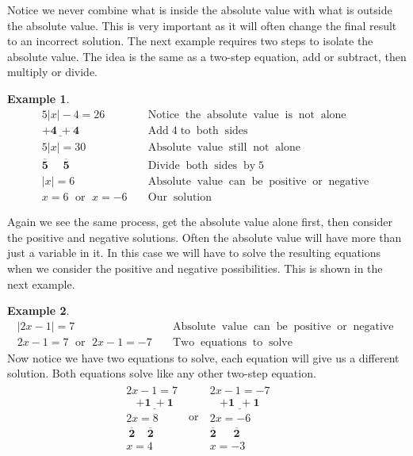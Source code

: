 \documentclass[12pt]{book}
\theoremstyle{definition}
\newtheorem{example}{Example}
\newcommand{\tmmathbf}[1]{\ensuremath{\boldsymbol{#1}}}
\newcommand{\tmop}[1]{\ensuremath{\operatorname{#1}}}
\begin{document}
Notice we never combine what is inside the absolute value with what is outside the absolute value. This is very important as it will often change the final result to an incorrect solution. The next example requires two steps to isolate the absolute value. The idea is the same as a two-step equation, add or subtract, then multiply or divide.
\begin{example}\label{Lin37}
  \begin{eqnarray*}
    5 |x| - 4 = 26 &  & \tmop{Notice} \tmop{the} \tmop{absolute} \tmop{value}
    \tmop{is} \tmop{not} \tmop{alone}\\
    \underline{\tmmathbf{+ 4 ~+ 4}} &  & \tmop{Add} 4 \tmop{to} \tmop{both}
    \tmop{sides}\\
    5 |x| = 30 &  & \tmop{Absolute} \tmop{value} \tmop{still} \tmop{not}
    \tmop{alone}\\
    \tmmathbf{\overline{5} ~~~~~~ \overline{5}}~ &  & \tmop{Divide} \tmop{both}
    \tmop{sides} \tmop{by} 5\\
    |x| = 6 &  & \tmop{Absolute} \tmop{value} \tmop{can} \tmop{be}
    \tmop{positive} \tmop{or} \tmop{negative}\\
    x = 6 \tmop{~or~} x = - 6 &  & \tmop{Our} \tmop{solution}
  \end{eqnarray*}
\end{example}
Again we see the same process, get the absolute value alone first, then consider the positive and negative solutions. Often the absolute value will have more than just a variable in it. In this case we will have to solve the resulting equations when we consider the positive and negative possibilities. This is shown in the next example.
\begin{example}\label{Lin38}
  \begin{eqnarray*}
    |2x - 1| = 7 &  & \tmop{Absolute} \tmop{value} \tmop{can} \tmop{be}
    \tmop{positive} \tmop{or} \tmop{negative}\\
    2 x - 1 = 7 \tmop{~or~} 2 x - 1 = - 7 &  & \tmop{Two} \tmop{equations}
    \tmop{to} \tmop{solve}
  \end{eqnarray*}
   Now notice we have two equations to solve, each equation will give us a
  different solution. Both equations solve like any other two-step equation.
  \begin{eqnarray*}
    \begin{array}{l}
      2 x - 1 = 7\\
      ~~~~\tmmathbf{\underline{+ 1 ~+ 1}}\\
      2 x = 8\\
      ~\tmmathbf{\overline{2} ~~~~~ \overline{2}}\\
      x = 4
    \end{array} \tmop{~or~} \begin{array}{l}
      2 x - 1 = - 7\\
      ~~~~\underline{\tmmathbf{+ 1 ~~+ 1}}\\
      2 x = - 6\\
      \tmmathbf{\overline{2} ~~~~~~~ \overline{2}}\\
      x = - 3
    \end{array} &  & 
  \end{eqnarray*}
\end{example}  
\end{document}
